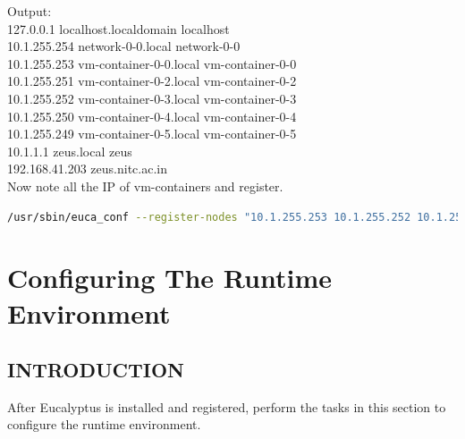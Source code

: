 Output:\\
127.0.0.1    \hspace{6mm}   localhost.localdomain \hspace{6mm}  localhost\\
10.1.255.254  \hspace{6mm}  network-0-0.local   \hspace{6mm}    network-0-0\\
10.1.255.253   \hspace{6mm} vm-container-0-0.local \hspace{6mm} vm-container-0-0\\
10.1.255.251  \hspace{6mm}  vm-container-0-2.local\hspace{6mm}  vm-container-0-2\\
10.1.255.252  \hspace{6mm}  vm-container-0-3.local \hspace{6mm} vm-container-0-3\\
10.1.255.250  \hspace{6mm}  vm-container-0-4.local \hspace{6mm} vm-container-0-4\\
10.1.255.249   \hspace{6mm} vm-container-0-5.local \hspace{6mm} vm-container-0-5\\
10.1.1.1    \hspace{6mm}    zeus.local  \hspace{6mm}    zeus\\
192.168.41.203 \hspace{6mm} zeus.nitc.ac.in\\


Now note all the IP of vm-containers and register.
\begin{lstlisting}[language=bash]
/usr/sbin/euca_conf --register-nodes "10.1.255.253 10.1.255.252 10.1.255.251 10.1.255.250 10.1.255.249"
\end{lstlisting}






\chapter{Configuring The Runtime Environment}
\section{INTRODUCTION}
After Eucalyptus is installed and registered, perform the tasks in this section to configure the runtime environment.
